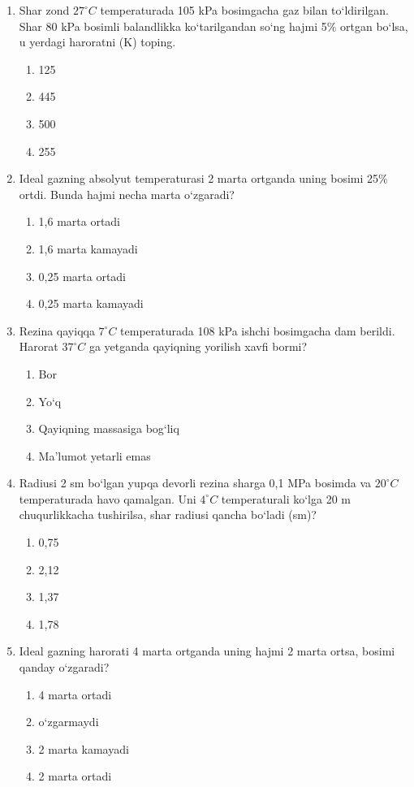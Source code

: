 \begin{enumerate}
\item Shar zond $27^\circ C$ temperaturada 105 kPa bosimgacha gaz bilan to‘ldirilgan. Shar 80 kPa bosimli balandlikka ko‘tarilgandan so‘ng hajmi 5\% ortgan bo‘lsa, u yerdagi haroratni (K) toping.
\begin{enumerate}[label=\Alph*)]
\item 125
\item 445
\item 500
\item 255
\end{enumerate}

\item Ideal gazning absolyut temperaturasi 2 marta ortganda uning bosimi 25\% ortdi. Bunda hajmi necha marta o‘zgaradi?
\begin{enumerate}[label=\Alph*)]
\item 1,6 marta ortadi
\item 1,6 marta kamayadi
\item 0,25 marta ortadi
\item 0,25 marta kamayadi
\end{enumerate}

\item Rezina qayiqqa $7^\circ C$ temperaturada 108 kPa ishchi bosimgacha dam berildi. Harorat $37^\circ C$ ga yetganda qayiqning yorilish xavfi bormi?
\begin{enumerate}[label=\Alph*)]
\item Bor
\item Yo‘q
\item Qayiqning massasiga bog‘liq
\item Ma'lumot yetarli emas
\end{enumerate}

\item Radiusi 2 sm bo‘lgan yupqa devorli rezina sharga 0,1 MPa bosimda va $20^\circ C$ temperaturada havo qamalgan. Uni $4^\circ C$ temperaturali ko‘lga 20 m chuqurlikkacha tushirilsa, shar radiusi qancha bo‘ladi (sm)?
\begin{enumerate}[label=\Alph*)]
\item 0,75
\item 2,12
\item 1,37
\item 1,78
\end{enumerate}

\item Ideal gazning harorati 4 marta ortganda uning hajmi 2 marta ortsa, bosimi qanday o‘zgaradi?
\begin{enumerate}[label=\Alph*)]
\item 4 marta ortadi
\item o‘zgarmaydi
\item 2 marta kamayadi
\item 2 marta ortadi
\end{enumerate}


\end{enumerate}
